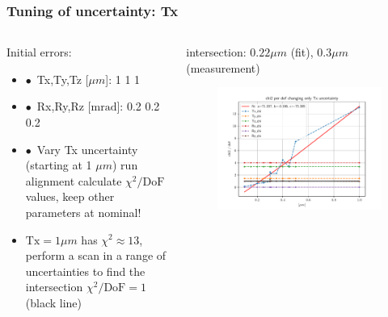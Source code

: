 \documentclass[aspectratio=1610, 12pt, xcolor=dvipsnames]{beamer}
\begin{document}
\begin{frame}\frametitle{Tuning of uncertainty: Tx}
  \begin{columns}
    \begin{column}[c]{0.48\textwidth}
      Initial errors:
      \begin{itemize}
        \setlength\itemsep{0em}
        \item $\bullet$\, Tx,Ty,Tz [$\mu m$]: 1 1 1
        \item $\bullet$\, Rx,Ry,Rz [$\text{mrad}$]: 0.2 0.2 0.2
        \item $\bullet$\, Vary Tx uncertainty (starting at 1 $\mu m$) \to run alignment \to calculate $\chi^2/\text{DoF}$ values, keep other parameters at nominal!
        \item \to $\text{Tx}= 1\mu m$ has $\chi^2 \approx 13$, perform a scan in a range of uncertainties to find the intersection $\chi^2/\text{DoF} = 1$ (black line)
      \end{itemize}
    \end{column}
      \begin{column}[c]{0.48\textwidth}
        intersection: $0.22 \mu m$ (fit), $0.3 \mu m$ (measurement)
        \begin{figure}
          \includegraphics[width=\textwidth]{plots/retest/only_Tx_full_fit.pdf}
        \end{figure}
      \end{column}
  \end{columns}
\end{frame}
\end{document}
